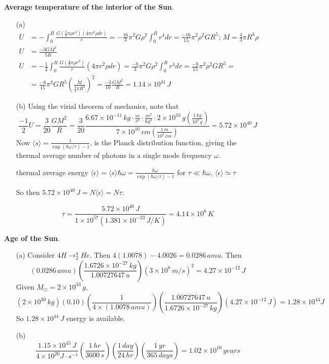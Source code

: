 \documentclass[twoside]{amsart}
\theoremstyle{plain}
\theoremstyle{definition}
\newcommand{\solutionhead}[1]
  {
   \noindent{\small\bf Solution #1.}
   }
\begin{document}
\solutionhead{3} \textbf{Average temperature of the interior of the Sun}.  
\begin{itemize}
\item[(a)] 
\[
\begin{aligned}
  U & = - \int_0^R \frac{ G \left( \frac{4}{3} \pi \rho r^3 \right) ( 4\pi r^2 \rho dr ) }{ r} = - \frac{16}{3} \pi^2 G \rho^2 \int_0^R r^4 dr = \frac{-16}{15} \pi^2 \rho^2 GR^5; \, M = \frac{4}{3} \pi R^3 \rho \\ 
  U & = \frac{- 3 GM^2 }{5 R } \\
  U & = -\frac{1}{2} \int_0^R \frac{ G \left( \frac{4}{3} \pi \rho r^3  \right) }{ r } (4 \pi r^2 \rho dr ) = \frac{ - 8 }{3} \pi^2 G \rho^2 \int_0^R r^4 dr = \frac{- 8 }{15} \pi^2 \rho^2 GR^5 = \\ 
  & = \frac{-8}{15} \pi^2 GR^5 \left( \frac{ M }{ \frac{4}{3} \pi R^3 } \right)^2 = \frac{-3}{10} \frac{GM^2 }{R} = 1.14 \times 10^{41} \, J
\end{aligned}
\]
\item[(b)] Using the virial theorem of mechanics, note that 
\[
\frac{-1}{2} U = \frac{3}{20} \frac{ GM^2}{R} = \frac{3}{20} \frac{ 6.67 \times 10^{-11} \, kg \cdot \frac{m}{s^2} \cdot \frac{m^2}{ kg^2} \cdot 2 \times 10^{33} \, g \left( \frac{ 1 \, kg }{ 10^3 \, g } \right) }{ 7 \times 10^{10} \, cm \left( \frac{1 \, m}{ 10^2 \, cm } \right) } = 5.72 \times 10^{40} \, J
\]
Now $\langle s \rangle = \frac{1}{ \exp{ ( \hbar \omega /\tau )} - 1 }$, is the Planck distribution function, giving the thermal average number of photons in a single mode frequency $\omega$.  

thermal average energy $\langle \epsilon \rangle = \langle s \rangle \hbar \omega = \frac{ \hbar \omega}{ \exp{ ( \hbar \omega/\tau )} - 1 }$ for $\tau \ll \hbar \omega$, $\langle \epsilon \rangle \simeq \tau$

So then $5.72 \times 10^{40} \, J = N \langle \epsilon \rangle = N \tau$.

\[
\tau = \frac{ 5.72 \times 10^{40} \, J }{ 1 \times 10^{57 } ( 1.381 \times 10^{-23} \, J/K ) } = \boxed{ 4.14 \times 10^6 \, K }
\]
\end{itemize}  



\solutionhead{4} \textbf{Age of the Sun}.  
\begin{itemize}
\item[(a)] Consider  $4H \to ^4_2He$.  Then $4 (1.0078) - 4.0026 = 0.0286 \, amu$.  Then 
\[
(0.0286 \, amu)\left( \frac{ 1.6726 \times 10^{-27} \, kg}{1.00727647 \, u} \right)(3\times 10^8 \, m/s)^2 = 4.27 \times 10^{-12} \, J
\] 
Given $M_{\odot} = 2 \times 10^33 \, g$, 
\[
(2 \times 10^{30} \, kg)(0.10)\left( \frac{1}{ 4 \times (1.0078 \, amu) } \right) \left( \frac{ 1.00727647 \, u}{ 1.6726 \times 10^{-27} \, kg } \right) (4.27 \times 10^{-12} \, J ) = 1.28 \times 10^{44} J
\]
So $\boxed{ 1.28 \times 10^{44} \, J}$ energy is available.  
\item[(b)]
\[
\frac{1.15 \times 10^{45} \, J}{ 4 \times 10^{26} J \cdot s^{-1} } \left( \frac{ 1 \, hr }{3600 \, s} \right) \left( \frac{ 1\, day }{ 24 \, hr } \right) \left( \frac{ 1 \, yr }{365 \, days} \right) = 1.02  \times 10^{10} \, years 
\]
\end{itemize}
\end{document}

